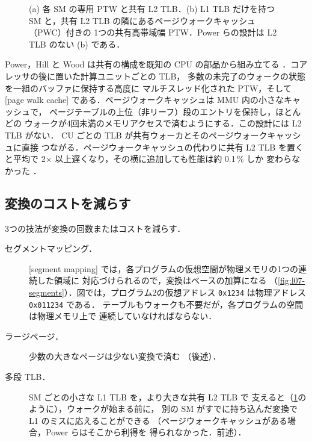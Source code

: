 \documentclass[../main.tex]{subfiles}
\begin{document}
\begin{figure}[tb]
  \centering
  
  \caption{(a) 各 SM の専用 PTW と共有 L2 TLB．(b) L1 TLB だけを持つ
    SM と，共有 L2 TLB の隣にあるページウォークキャッシュ（PWC）付きの
    1つの共有高帯域幅 PTW．Power らの設計は L2 TLB のない (b) である．}
  \label{fig:l07-ptw-sharing}
\end{figure}

Power，Hill と Wood は共有の構成を既知の CPU の部品から組み立てる
\cite{power2014x86}．コアレッサの後に置いた計算ユニットごとの TLB，
多数の未完了のウォークの状態を一組のバッファに保持する高度に
マルチスレッド化された PTW，そして
[page walk cache]
である．ページウォークキャッシュは MMU 内の小さなキャッシュで，
ページテーブルの上位（非リーフ）段のエントリを保持し，ほとんどの
ウォークが4回未満のメモリアクセスで済むようにする．この設計には L2 TLB がない．
CU ごとの TLB が共有ウォーカとそのページウォークキャッシュに直接
つながる．ページウォークキャッシュの代わりに共有 L2 TLB を置くと平均で
2$\times$ 以上遅くなり，その横に追加しても性能は約 0.1\,\% しか
変わらなかった \cite[§6]{power2014x86}．

\subsection{変換のコストを減らす}

3つの技法が変換の回数またはコストを減らす．
\begin{marginfigure}
  
  \caption{セグメントマッピング：同じ仮想範囲を持つ3つのプログラムが
    3つの \SI{64}{\kibi\byte} の物理セグメントに置かれる．}
  \label{fig:l07-segments}
\end{marginfigure}
\begin{description}
  \item[セグメントマッピング．]
    [segment mapping]
    では，各プログラムの仮想空間が物理メモリの1つの連続した領域に
    対応づけられるので，変換はベースの加算になる
    （\cref{fig:l07-segments}）．図では，プログラム2の仮想アドレス
    \texttt{0x1234} は物理アドレス \texttt{0x011234} である．
    テーブルもウォークも不要だが，各プログラムの空間は物理メモリ上で
    連続していなければならない．
  \item[ラージページ．]  少数の大きなページは少ない変換で済む
    （後述）．
  \item[多段 TLB．]  SM ごとの小さな L1 TLB を，より大きな共有 L2 TLB で
    支えると（\cref{fig:l07-ptw-sharing}のように），ウォークが始まる前に，
    別の SM がすでに持ち込んだ変換で L1 のミスに応えることができる
    （ページウォークキャッシュがある場合，Power らはそこから利得を
    得られなかった．前述）．
\end{description}
\end{document}
